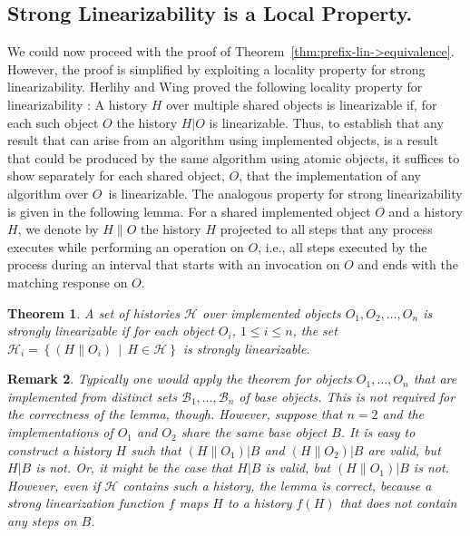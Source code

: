 \documentclass[11pt,letterpaper]{article}
\newtheorem{theorem}{Theorem}[section]
\newtheorem{remark}[theorem]{Remark}
\newcommand{\BB}{\mathcal{B}}
\newcommand{\HH}{\mathcal{H}}
\newcommand{\obj}{\ensuremath{\mathit{O}}}
\begin{document}
\subsection{Strong Linearizability is a Local Property.}
We could now proceed with the proof of Theorem~\ref{thm:prefix-lin->equivalence}.
However, the proof is simplified by exploiting a locality property for strong linearizability.
Herlihy and Wing proved the following locality property for linearizability \cite{her:lin}:
A history $H$
over multiple shared objects is linearizable if, for each such object $\obj$ the history $H|\obj$ is linearizable.
Thus, to establish that any result that can arise from an algorithm using implemented objects,
is a result that could be produced by the same algorithm using atomic objects,
it suffices to show separately for each shared object, \obj,
that the implementation of any algorithm over \obj\ is linearizable.
The analogous property for strong linearizability is
given in the following lemma.
For a shared implemented object $\obj$ and a history $H$, we denote by $H\|\obj$
the history $H$ projected to all steps that any process executes while performing an operation on $\obj$, i.e., all steps executed by the process during an interval that starts with an invocation on $\obj$ and ends with the matching response on $\obj$.


\begin{theorem}\label{thm:locality}
  A set of histories $\HH$ over implemented objects $\obj_1, \obj_2, \ldots, \obj_n$
  is strongly linearizable if for each object $\obj_i$, $1 \leq i \leq n$,
  the set $\HH_i = \left\{(H\|\obj_i)\,\mid\,H \in \HH\right\}$ is strongly linearizable.
\end{theorem}

  \begin{remark}
     Typically one would apply the theorem for objects $O_1,\dots,O_n$ that are implemented from distinct sets $\BB_1,\dots,\BB_n$ of base objects.
     This is not required for the correctness of the lemma, though.
     However, suppose that $n=2$ and the implementations of $O_1$ and $O_2$ share the same base object $B$.
     It is easy to construct a history $H$ such that $(H\|O_1)|B$ and $(H\|O_2)|B$ are valid, but $H|B$ is not.
     Or, it might be the case that $H|B$ is valid, but $(H\|O_1)|B$ is not.
     However, even if $\HH$ contains such a history, the lemma is correct, because a strong linearization function $f$ maps $H$ to a history $f(H)$ that does not contain any steps on $B$.
  \end{remark}
\end{document}
